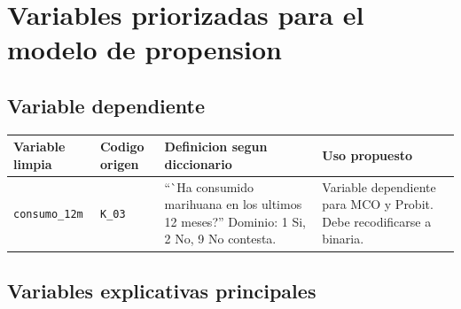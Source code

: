\documentclass[11pt]{article}
\begin{document}
\section{Variables priorizadas para el modelo de propension}

\subsection{Variable dependiente}

\begin{longtable}{p{3cm} p{2.2cm} p{6.2cm} p{4.1cm}}
\toprule
Variable limpia & Codigo origen & Definicion segun diccionario & Uso propuesto \\
\midrule
\endhead
\texttt{consumo\_12m} & \texttt{K\_03} & ``\`{ }Ha consumido marihuana en los ultimos 12 meses?'' Dominio: 1 Si, 2 No, 9 No contesta. & Variable dependiente para MCO y Probit. Debe recodificarse a binaria. \\
\bottomrule
\end{longtable}

\subsection{Variables explicativas principales}
\end{document}
